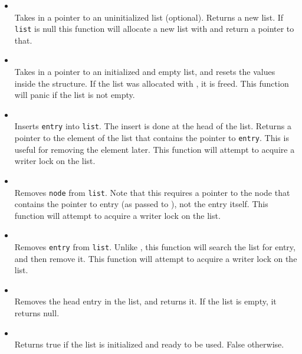 \begin{itemize}
\item {} \\
Takes in a pointer to an uninitialized list (optional). Returns a new list. 
If \texttt{list} is null this function will allocate a new list with 
 and return a pointer to that.

\item {} \\
Takes in a pointer to an initialized and empty list, and resets the values
inside the structure. If the list was allocated with , it is freed.
This function will panic if the list is not empty. 
\item {} \\
Inserts \texttt{entry} into \texttt{list}. The insert is done at the head of the list. 
Returns a pointer to the element of the list that contains the pointer to \texttt{entry}.
This is useful for removing the element later. This function will attempt to acquire a writer lock
on the list.

\item {} \\
Removes \texttt{node} from \texttt{list}. Note that this requires a pointer to the node that contains
the pointer to entry (as passed to ), not the entry itself. This function will attempt to acquire 
a writer lock on the list.

\item {} \\
Removes \texttt{entry} from \texttt{list}. Unlike , this function will search the
list for entry, and then remove it. This function will attempt to acquire a writer lock on the list.

\item {} \\
Removes the head entry in the list, and returns it. If the list is empty, it returns null.

\item {} \\
Returns true if the list is initialized and ready to be used. False otherwise.


\end{itemize}

